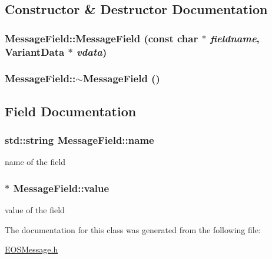 \subsection{Constructor \& Destructor Documentation}
\hypertarget{classMessageField_ed47fc5d3fa9f97a88a4875cb72f6112}{
\subsubsection[{MessageField}]{\setlength{\rightskip}{0pt plus 5cm}MessageField::MessageField (const char $\ast$ {\em fieldname}, \/  {\bf VariantData} $\ast$ {\em vdata})}}
\label{classMessageField_ed47fc5d3fa9f97a88a4875cb72f6112}


\hypertarget{classMessageField_315f714e7d335b82720d6015b12bab31}{
\subsubsection[{$\sim$MessageField}]{\setlength{\rightskip}{0pt plus 5cm}MessageField::$\sim$MessageField ()}}
\label{classMessageField_315f714e7d335b82720d6015b12bab31}




\subsection{Field Documentation}
\hypertarget{classMessageField_86e5327bd97c0ce8a60faf292026b856}{
\subsubsection[{name}]{\setlength{\rightskip}{0pt plus 5cm}std::string {\bf MessageField::name}}}
\label{classMessageField_86e5327bd97c0ce8a60faf292026b856}


name of the field 

\hypertarget{classMessageField_00e1559f3b65ceee59d27ba99dd5e2c0}{
\subsubsection[{value}]{$\ast$ {\bf MessageField::value}}}
\label{classMessageField_00e1559f3b65ceee59d27ba99dd5e2c0}


value of the field 



The documentation for this class was generated from the following file:\begin{CompactItemize}
\item 
\hyperlink{EOSMessage_8h}{EOSMessage.h}\end{CompactItemize}
